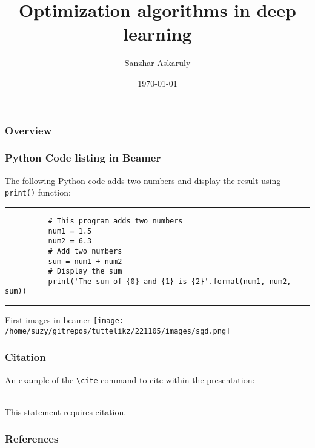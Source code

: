 \documentclass{beamer}
\title[CodeSeoul] %
	{Optimization algorithms in deep learning}
\author[AI Research Paper Review] %
	{Sanzhar Askaruly}
\institute[] %
	{ Ulsan National Institute of Science and Technology\newline
	  Ph.D. Candidate in Biomedical Engineering}
\date{\today}
\begin{document}

    \begin{frame}
    \frametitle{Overview} %
    \tableofcontents 
    \end{frame}

    \begin{frame}[fragile]
      \frametitle{Python Code listing in Beamer}
      The following Python code adds two numbers and display the result using \verb|print()| function:
      \rule{\textwidth}{1pt}
      \scriptsize
      \begin{verbatim}
          # This program adds two numbers
          num1 = 1.5
          num2 = 6.3
          # Add two numbers
          sum = num1 + num2
          # Display the sum
          print('The sum of {0} and {1} is {2}'.format(num1, num2, sum))
      \end{verbatim}
      \rule{\textwidth}{1pt}
    \end{frame}

    \begin{frame}{First images in beamer}
      \centering
          \texttt{[image: /home/suzy/gitrepos/tuttelikz/221105/images/sgd.png]}
    \end{frame}
    

    \begin{frame}[fragile] %
    \frametitle{Citation}
    An example of the \verb|\cite| command to cite within the presentation:\\~
    
    This statement requires citation.~\cite{test1} 
    \end{frame}

    

    \begin{frame}[t, allowframebreaks]
      \frametitle{References}
      
      
    \end{frame}
\end{document}
